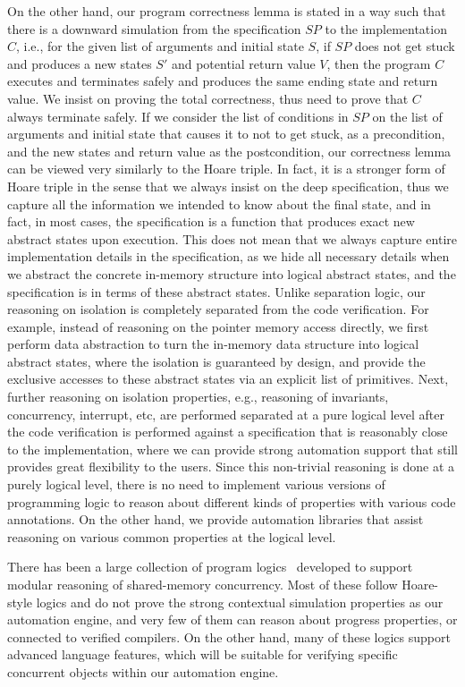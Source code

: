 On the other hand, our program correctness lemma is stated in a way such that there is a downward simulation from the specification $SP$
to the implementation $C$, i.e., for the given list of arguments and initial state $S$, if $SP$ does not get stuck and produces a new 
states $S'$ and potential return value $V$, then the program $C$ executes and terminates safely and produces the same ending state and return value.
We insist on proving the total correctness, thus need to prove that $C$ always terminate safely.
If we consider the list of conditions in $SP$ on the list of arguments and initial state that causes it to not to get stuck, as a precondition,
and the new states and return value as the postcondition, our correctness lemma can be viewed very similarly to the Hoare triple.
In fact, it is a stronger form of Hoare triple in the sense that we always insist on the deep specification, thus we capture all the information
we intended to know about the final state, and in fact, in most cases, the specification is a function that produces exact new abstract states upon 
execution. This does not mean that we always capture entire implementation details in the specification, as we hide all necessary details
when we abstract the concrete in-memory structure into logical abstract states, and the specification is in terms of these abstract states.
Unlike separation logic, our reasoning on isolation is completely separated from the code verification. For example, instead of reasoning
on the pointer memory access directly, we first perform data abstraction to turn the in-memory data structure into logical abstract states,
where the isolation is guaranteed by design, and provide the exclusive accesses to these abstract states via an explicit list of primitives.
Next, further reasoning on isolation properties, e.g., reasoning of invariants, concurrency, interrupt, etc, are performed separated
at a pure logical level after the code verification is performed against a specification that is reasonably close to the implementation,
where we can provide strong automation support that still provides great flexibility to the users.
Since this non-trivial reasoning is done at a purely logical level, there is no need to implement various versions of programming logic
to reason about different kinds of properties with various code annotations.
On the other hand, we provide automation libraries that assist reasoning on various common properties at the logical level. 

There has been a large collection of program
logics~\cite{ohearn:concur04,brookes:concur04,feng07:sagl,vafeiadis:marriage,LRG,verifast,gotsman13,Turon13popl,Turon13icfp,nanevski13,nanevski14,sergey15,sergey15pldi,pinto14,iris15,civl15,pinto16,xu16}
developed to support modular reasoning of shared-memory concurrency. 
Most of these follow Hoare-style logics and
do not prove the strong contextual simulation properties as our automation engine,
and very few of them can reason about progress properties, or connected to verified compilers.
On the other hand, many of these logics support advanced language features,
which will be suitable for verifying specific concurrent objects
within our automation engine.

